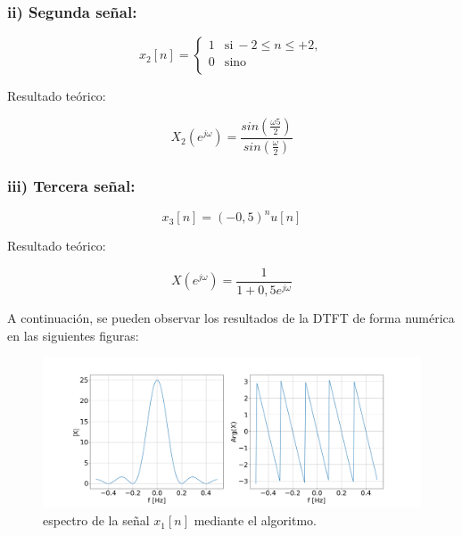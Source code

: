 \documentclass[11pt,a4paper]{article}
\begin{document}
    \subsubsection*{ii) Segunda señal:}

    \begin{equation} 
        x_{2}[n] = \left\{ 
        \begin{array}{ll} 
        1 & \mathrm{si\ } -2\leq n \leq +2, \\
        0 & \mathrm{sino\ } \\
        \end{array} 
        \right.
    \end{equation}

    Resultado teórico:
    
    \begin{equation}
    X_{2}(e^{j \omega})= \frac{sin(\frac{ \omega 5}{2})}{sin (\frac{\omega}{2})}
    \end{equation}

    \subsubsection*{iii) Tercera señal:}

    \begin{equation} 
        x_{3}[n]=(-0,5)^{n}u[n]
    \end{equation}
    
    Resultado teórico:
    
    \begin{equation}
    X(e^{j \omega})=\frac{1}{1+0,5 e^{j \omega}}
    \end{equation}
    
    A continuación, se pueden observar los resultados de la DTFT de forma numérica en las siguientes figuras:
    
    \begin{figure}[H]
    \centering
    \includegraphics[width=\textwidth]{Img/punto_3_e_1.png}
    \caption{espectro de la señal $x_{1}[n]$ mediante el algoritmo.}
    \label{fig.3ei}
    \end{figure} 
\end{document}
